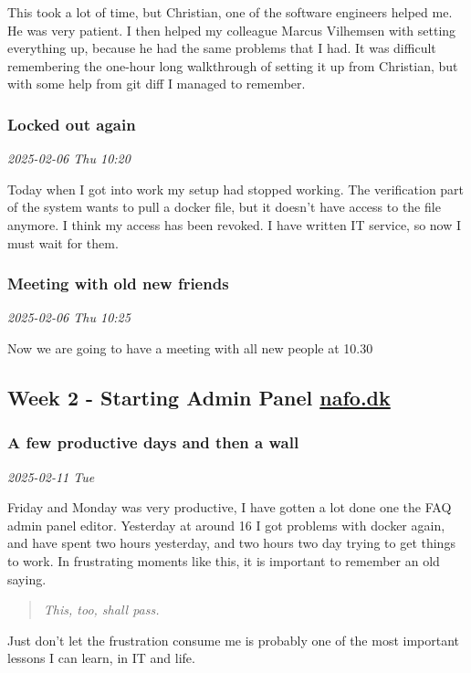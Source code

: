 \documentclass[../main.tex]{subfiles}
\begin{document}
This took a lot of time, but Christian, one of the software engineers helped me. He was very patient. I then helped my colleague Marcus Vilhemsen with setting everything up, because he had the same problems that I had. It was difficult remembering the one-hour long walkthrough of setting it up from Christian, but with some help from git diff I managed to remember.

\subsubsection{Locked out again}

\noindent \textit{2025-02-06 Thu 10:20}

Today when I got into work my setup had stopped working. The verification part of the system wants to pull a docker file, but it doesn't have access to the file anymore. I think my access has been revoked. I have written IT service, so now I must wait for them.

\subsubsection{Meeting with old new friends}

\noindent \textit{2025-02-06 Thu 10:25}

Now we are going to have a meeting with all new people at 10.30 

\subsection{Week 2 - Starting Admin Panel \href{https://www.nationaltforsoegsoverblik.dk/}{nafo.dk}}
\subsubsection{A few productive days and then a wall}

\noindent \textit{2025-02-11 Tue}

Friday and Monday was very productive, I have gotten a lot done one the FAQ admin panel editor. Yesterday at around 16 I got problems with docker again, and have spent two hours yesterday, and two hours two day trying to get things to work. In frustrating moments like this, it is important to remember an old saying.

\begin{quote}
\emph{This, too, shall pass.}
\end{quote}

Just don't let the frustration consume me is probably one of the most important lessons I can learn, in IT and life.
\end{document}
